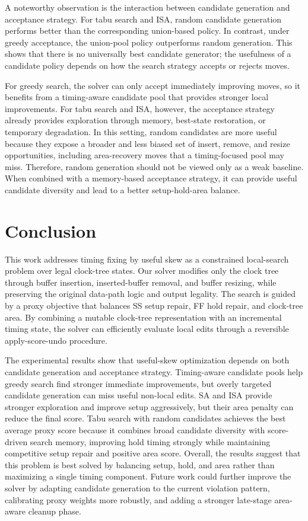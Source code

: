 \documentclass{article}
\begin{document}
A noteworthy observation is the interaction between candidate generation and acceptance strategy. 
For tabu search and ISA, random candidate generation performs better than the corresponding union-based policy. 
In contrast, under greedy acceptance, the union-pool policy outperforms random generation. 
This shows that there is no universally best candidate generator; the usefulness of a candidate policy depends on how the search strategy accepts or rejects moves.

For greedy search, the solver can only accept immediately improving moves, so it benefits from a timing-aware candidate pool that provides stronger local improvements. 
For tabu search and ISA, however, the acceptance strategy already provides exploration through memory, best-state restoration, or temporary degradation. 
In this setting, random candidates are more useful because they expose a broader and less biased set of insert, remove, and resize opportunities, including area-recovery moves that a timing-focused pool may miss. 
Therefore, random generation should not be viewed only as a weak baseline. 
When combined with a memory-based acceptance strategy, it can provide useful candidate diversity and lead to a better setup-hold-area balance.


\section{Conclusion}

This work addresses timing fixing by useful skew as a constrained local-search problem over legal clock-tree states. 
Our solver modifies only the clock tree through buffer insertion, inserted-buffer removal, and buffer resizing, while preserving the original data-path logic and output legality. 
The search is guided by a proxy objective that balances SS setup repair, FF hold repair, and clock-tree area. 
By combining a mutable clock-tree representation with an incremental timing state, the solver can efficiently evaluate local edits through a reversible apply-score-undo procedure.

The experimental results show that useful-skew optimization depends on both candidate generation and acceptance strategy. 
Timing-aware candidate pools help greedy search find stronger immediate improvements, but overly targeted candidate generation can miss useful non-local edits. 
SA and ISA provide stronger exploration and improve setup aggressively, but their area penalty can reduce the final score. 
Tabu search with random candidates achieves the best average proxy score because it combines broad candidate diversity with score-driven search memory, improving hold timing strongly while maintaining competitive setup repair and positive area score. 
Overall, the results suggest that this problem is best solved by balancing setup, hold, and area rather than maximizing a single timing component. 
Future work could further improve the solver by adapting candidate generation to the current violation pattern, calibrating proxy weights more robustly, and adding a stronger late-stage area-aware cleanup phase.
\end{document}
